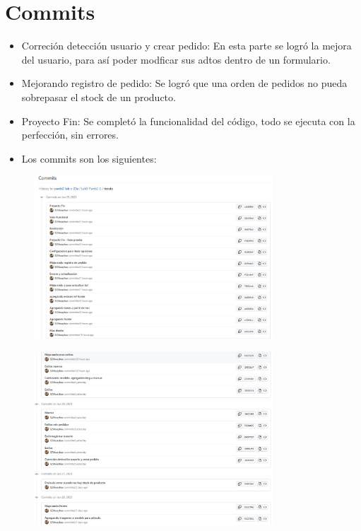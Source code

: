\documentclass{article}
\begin{document}
    \section{Commits}
    \begin{itemize}
        \item Correción detección usuario y crear pedido: En esta parte se logró la mejora del usuario, para así poder modficar sus adtos dentro de un formulario.
        \item Mejorando registro de pedido: Se logró que una orden de pedidos no pueda sobrepasar el stock de un producto.
        \item Proyecto Fin: Se completó la funcionalidad del código, todo se ejecuta con la perfección, sin errores.
        \item Los commits son los siguientes:
    \end{itemize}
    \begin{figure}[H]
		      \centering
                \includegraphics[width=0.8\textwidth,keepaspectratio]{img/N1.jpeg}
	   \end{figure}
    \begin{figure}[H]
		      \centering
                \includegraphics[width=0.8\textwidth,keepaspectratio]{img/N2.jpeg}
	   \end{figure}
\end{document}
